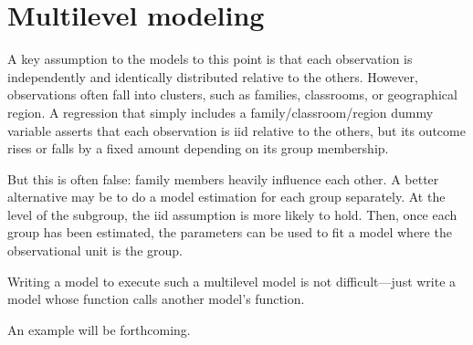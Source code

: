 \section{Multilevel modeling} A key assumption to the models to this
point is that each observation is independently and identically distributed
relative to the others. However, observations often fall into clusters,
such as families, classrooms, or geographical region. 
A regression that simply includes a family/classroom/region dummy variable
asserts that each observation is iid relative to the others, but its
outcome rises or falls by a fixed amount depending on its group
membership.

But this is often false: family members heavily influence each other.
A better alternative may be to do a model estimation for each group
separately. At the level of the subgroup, the iid assumption is more
likely to hold. Then, once each group has been estimated, the parameters
can be used to fit a model where the observational unit is the group.

Writing a model to execute such a multilevel model is not
difficult---just write a model whose  function calls
another model's  function. 

An example will be forthcoming.


